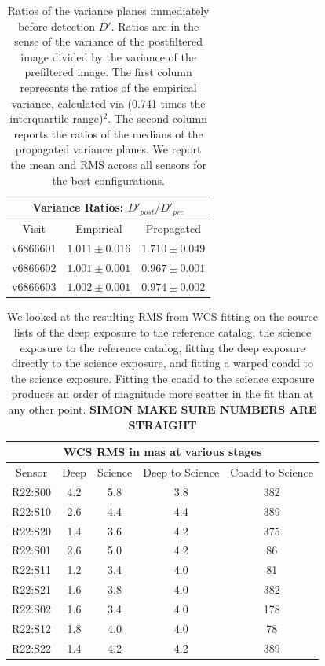 \documentclass[prd, nofootinbib, floatfix, 11pt,tightenlines,times]{article}
\begin{document}
\begin{table}
\centering
\begin{tabular}{ccc}
\hline
\multicolumn{3}{|c|}{Variance Ratios: $D'_{post} / D'_{pre}$} \\
\hline
Visit    & Empirical & Propagated \\
\hline
v6866601 & $1.011 \pm 0.016$    & $1.710 \pm 0.049$    \\
v6866602 & $1.001 \pm 0.001$    & $0.967 \pm 0.001$    \\
v6866603 & $1.002 \pm 0.001$    & $0.974 \pm 0.002$    \\
\end{tabular}
\caption{Ratios of the variance planes immediately before detection
  $D'$.  Ratios are in the sense of the variance of the postfiltered
  image divided by the variance of the prefiltered image.  The first
  column represents the ratios of the empirical variance, calculated
  via (0.741 times the interquartile range)$^2$.  The second column
  reports the ratios of the medians of the propagated variance planes.
  We report the mean and RMS across all sensors for the best
  configurations.}
\label{tab-variance2}
\end{table}


\clearpage
\begin{table}
\centering
\begin{tabular}{|c|c|c|c|c|}
\hline
\multicolumn{5}{|c|}{WCS RMS in mas at various stages} \\
\hline
Sensor    & Deep & Science &  Deep to Science & Coadd to Science \\
\hline
R22:S00&4.2&5.8&3.8&382\\ 
R22:S10&2.6&4.4&4.4&389\\
R22:S20&1.4&3.6&4.2&375\\
R22:S01&2.6&5.0&4.2&86\\
R22:S11&1.2&3.4&4.0&81\\
R22:S21&1.6&3.8&4.0&382\\
R22:S02&1.6&3.4&4.0&178\\
R22:S12&1.8&4.0&4.0&78\\
R22:S22&1.4&4.2&4.2&389\\
\hline
\end{tabular}
\caption{We looked at the resulting RMS from WCS fitting on the source lists of the deep exposure to the reference catalog, the science exposure to the reference catalog,
fitting the deep exposure directly to the science exposure, and fitting a warped coadd to the science exposure.  Fitting 
the coadd to the science exposure produces an order of magnitude more scatter in the fit than at any other point. {\bf SIMON MAKE SURE NUMBERS ARE STRAIGHT}\label{tab-wcsrms}}
\end{table}
\clearpage
\end{document}
